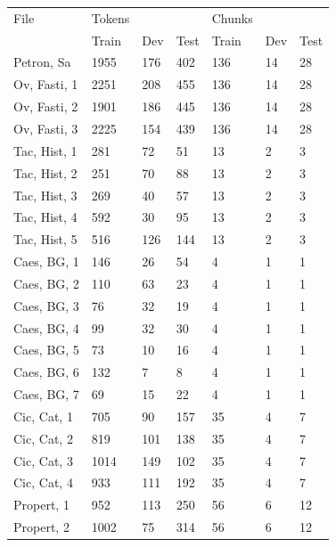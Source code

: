 \begin{table}[h]
\centering
\begin{tabular}{l|lll|lll}
\toprule
 File         & Tokens &      &      & Chunks &     &      \\
              & Train  & Dev  & Test & Train  & Dev & Test \\ \midrule
 Petron, Sa   & 1955   & 176  & 402  & 136    & 14  & 28   \\
 Ov, Fasti, 1 & 2251   & 208  & 455  & 136    & 14  & 28   \\
 Ov, Fasti, 2 & 1901   & 186  & 445  & 136    & 14  & 28   \\
 Ov, Fasti, 3 & 2225   & 154  & 439  & 136    & 14  & 28   \\
 Tac, Hist, 1 & 281    & 72   & 51   & 13     & 2   & 3    \\
 Tac, Hist, 2 & 251    & 70   & 88   & 13     & 2   & 3    \\
 Tac, Hist, 3 & 269    & 40   & 57   & 13     & 2   & 3    \\
 Tac, Hist, 4 & 592    & 30   & 95   & 13     & 2   & 3    \\
 Tac, Hist, 5 & 516    & 126  & 144  & 13     & 2   & 3    \\
 Caes, BG, 1  & 146    & 26   & 54   & 4      & 1   & 1    \\
 Caes, BG, 2  & 110    & 63   & 23   & 4      & 1   & 1    \\
 Caes, BG, 3  & 76     & 32   & 19   & 4      & 1   & 1    \\
 Caes, BG, 4  & 99     & 32   & 30   & 4      & 1   & 1    \\
 Caes, BG, 5  & 73     & 10   & 16   & 4      & 1   & 1    \\
 Caes, BG, 6  & 132    & 7    & 8    & 4      & 1   & 1    \\
 Caes, BG, 7  & 69     & 15   & 22   & 4      & 1   & 1    \\
 Cic, Cat, 1  & 705    & 90   & 157  & 35     & 4   & 7    \\
 Cic, Cat, 2  & 819    & 101  & 138  & 35     & 4   & 7    \\
 Cic, Cat, 3  & 1014   & 149  & 102  & 35     & 4   & 7    \\
 Cic, Cat, 4  & 933    & 111  & 192  & 35     & 4   & 7    \\
 Propert, 1   & 952    & 113  & 250  & 56     & 6   & 12   \\
 Propert, 2   & 1002   & 75   & 314  & 56     & 6   & 12   \\

\end{tabular}
\end{table}
